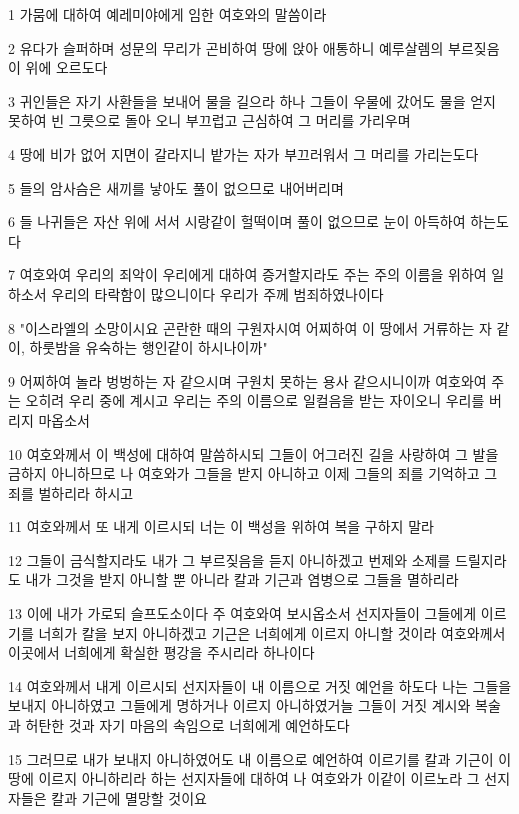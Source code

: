 \par 1 가뭄에 대하여 예레미야에게 임한 여호와의 말씀이라
\par 2 유다가 슬퍼하며 성문의 무리가 곤비하여 땅에 앉아 애통하니 예루살렘의 부르짖음이 위에 오르도다
\par 3 귀인들은 자기 사환들을 보내어 물을 길으라 하나 그들이 우물에 갔어도 물을 얻지 못하여 빈 그릇으로 돌아 오니 부끄럽고 근심하여 그 머리를 가리우며
\par 4 땅에 비가 없어 지면이 갈라지니 밭가는 자가 부끄러워서 그 머리를 가리는도다
\par 5 들의 암사슴은 새끼를 낳아도 풀이 없으므로 내어버리며
\par 6 들 나귀들은 자산 위에 서서 시랑같이 헐떡이며 풀이 없으므로 눈이 아득하여 하는도다
\par 7 여호와여 우리의 죄악이 우리에게 대하여 증거할지라도 주는 주의 이름을 위하여 일하소서 우리의 타락함이 많으니이다 우리가 주께 범죄하였나이다
\par 8 "이스라엘의 소망이시요 곤란한 때의 구원자시여 어찌하여 이 땅에서 거류하는 자 같이, 하룻밤을 유숙하는 행인같이 하시나이까"
\par 9 어찌하여 놀라 벙벙하는 자 같으시며 구원치 못하는 용사 같으시니이까 여호와여 주는 오히려 우리 중에 계시고 우리는 주의 이름으로 일컬음을 받는 자이오니 우리를 버리지 마옵소서
\par 10 여호와께서 이 백성에 대하여 말씀하시되 그들이 어그러진 길을 사랑하여 그 발을 금하지 아니하므로 나 여호와가 그들을 받지 아니하고 이제 그들의 죄를 기억하고 그 죄를 벌하리라 하시고
\par 11 여호와께서 또 내게 이르시되 너는 이 백성을 위하여 복을 구하지 말라
\par 12 그들이 금식할지라도 내가 그 부르짖음을 듣지 아니하겠고 번제와 소제를 드릴지라도 내가 그것을 받지 아니할 뿐 아니라 칼과 기근과 염병으로 그들을 멸하리라
\par 13 이에 내가 가로되 슬프도소이다 주 여호와여 보시옵소서 선지자들이 그들에게 이르기를 너희가 칼을 보지 아니하겠고 기근은 너희에게 이르지 아니할 것이라 여호와께서 이곳에서 너희에게 확실한 평강을 주시리라 하나이다
\par 14 여호와께서 내게 이르시되 선지자들이 내 이름으로 거짓 예언을 하도다 나는 그들을 보내지 아니하였고 그들에게 명하거나 이르지 아니하였거늘 그들이 거짓 계시와 복술과 허탄한 것과 자기 마음의 속임으로 너희에게 예언하도다
\par 15 그러므로 내가 보내지 아니하였어도 내 이름으로 예언하여 이르기를 칼과 기근이 이 땅에 이르지 아니하리라 하는 선지자들에 대하여 나 여호와가 이같이 이르노라 그 선지자들은 칼과 기근에 멸망할 것이요
